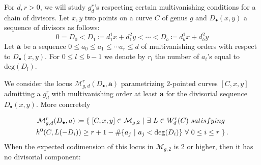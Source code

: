 \documentclass{article}
\theoremstyle{plain}
\theoremstyle{definition}
\def\cM{\mathcal{M}}
\begin{document}
For $d,r> 0$, we will study $g^r_d$'s respecting certain multivanishing conditions for a chain of divisors. Let $x, y$ two points on a curve $C$ of genus $g$ and $D_\bullet(x,y)$ a sequence of divisors as follows:
\[ 0 = D_0 < D_1\coloneqq d^1_1x + d^2_1y<\cdots <D_b \coloneqq  d^1_bx + d^2_by \]
Let $\textbf{a}$ be a sequence $0 \leq a_0 \leq a_1\leq\cdots a_r\leq d$ of multivanishing orders with respect to $D_\bullet(x,y)$. For $0\leq l \leq b-1$ we denote by $r_l$ the number of $a_i$'s equal to $\mathrm{deg}(D_l)$. 

We consider the locus $\cM^r_{g,d}(D_\bullet, \textbf{a})$ parametrizing $2$-pointed curves $[C,x,y]$ admitting a $g^r_d$ with multivanishing order at least $\textbf{a}$ for the divisorial sequence $D_\bullet(x,y)$. More concretely

\begin{multline*} \cM^r_{g, d}\text{\large (}D_\bullet, \textbf{a}\text{\large )} \coloneqq \left\{ \right. [C,x,y] \in \cM_{g,2} \ | \ \exists \ L\in W^r_d(C) \ \textrm{satisfying} \ \\  h^0\text{\Large (}C,L(-D_i)\text{\Large )} \geq r+1-\#\{a_j \ | \ a_j < \deg(D_i) \} \ \forall \ 0\leq i \leq r \left.\right\}.
\end{multline*}
When the expected codimension of this locus in $\cM_{g,2}$ is $2$ or higher, then it has no divisorial component:
\end{document}
